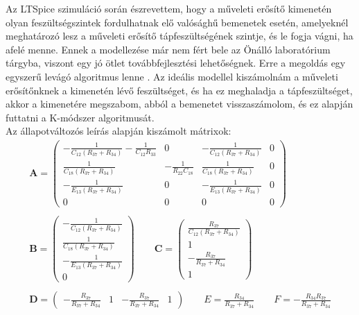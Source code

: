 Az LTSpice szimuláció során észrevettem, hogy a műveleti erősítő kimenetén olyan feszültségszintek fordulhatnak elő valósághű bemenetek esetén, 
amelyeknél meghatározó lesz a műveleti erősítő tápfeszültségének szintje, és le fogja vágni, ha afelé menne. Ennek a modellezése már nem fért bele az Önálló 
laboratórium tárgyba, viszont egy jó ötlet továbbfejlesztési lehetőségnek. Erre a megoldás egy egyszerű levágó algoritmus lenne \cite{opampo} \cite{opamp}. 
Az ideális modellel kiszámolnám a műveleti erősítőnknek a kimenetén lévő feszültséget, és ha ez meghaladja a tápfeszültséget, akkor a kimenetére megszabom, abból a bemenetet visszaszámolom, 
és ez alapján futtatni a K-módszer algoritmusát.\\
Az állapotváltozós leírás alapján kiszámolt mátrixok:
\begin{equation}
    \begin{array}{c}
        \mathbf{A}=
        \begin{pmatrix}
            -\frac{1}{C_{12}(R_{37}+R_{34})}-\frac{1}{C_{12}R_{33}} & 0 & -\frac{1}{C_{12}(R_{37}+R_{34})} & 0 \\
            \frac{1}{C_{18}(R_{37}+R_{34})} & -\frac{1}{R_{22}C_{18}} & \frac{1}{C_{18}(R_{37}+R_{34})} & 0 \\
            -\frac{1}{E_{13}(R_{37}+R_{34})} & 0 & -\frac{1}{E_{13}(R_{37}+R_{34})} & 0 \\
            0 & 0 & 0 & 0
        \end{pmatrix} \\ \\
        \mathbf{B}=
        \begin{pmatrix}
            -\frac{1}{C_{12}(R_{37}+R_{34})} \\
            \frac{1}{C_{18}(R_{37}+R_{34})} \\
            -\frac{1}{E_{13}(R_{37}+R_{34})} \\
            0
        \end{pmatrix} \qquad
        \mathbf{C}=
        \begin{pmatrix}
            \frac{R_{37}}{C_{12}(R_{37}+R_{34})} \\
            1 \\
            -\frac{R_{37}}{R_{37}+R_{34}} \\
            1
        \end{pmatrix} \\ \\
        \mathbf{D}=
        \begin{pmatrix}
            -\frac{R_{37}}{R_{37}+R_{34}} & 1 & -\frac{R_{37}}{R_{37}+R_{34}} & 1 
        \end{pmatrix} \qquad
        E=\frac{R_{34}}{R_{37}+R_{34}} \qquad
        F=-\frac{R_{34}R_{37}}{R_{37}+R_{34}}
    \end{array}
\end{equation}
